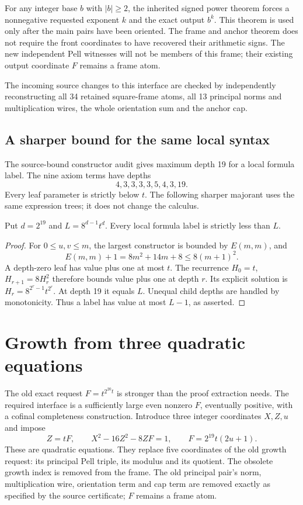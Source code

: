 For any integer base $b$ with $|b|\ge2$, the inherited signed power theorem
forces a nonnegative requested exponent $k$ and the exact output $b^k$.
This theorem is used only after the main pairs have been oriented. The frame
and anchor theorem does not require the front coordinates to have recovered
their arithmetic signs. The new independent Pell witnesses will not be
members of this frame; their existing output coordinate $F$ remains a frame
atom.

The incoming source changes to this interface are checked by independently
reconstructing all 34 retained square-frame atoms, all 13 principal norms and
multiplication wires, the whole orientation sum and the anchor cap.

\subsection{A sharper bound for the same local syntax}

The source-bound constructor audit gives maximum depth 19 for a local formula
label. The nine axiom terms have depths
\[
4,3,3,3,3,5,4,3,19.
\]
Every leaf parameter is strictly below $t$. The following sharper majorant
uses the same expression trees; it does not change the calculus.

\begin{lemma}\label{g210:lem:capacity}
Put $d=2^{19}$ and $L=8^{d-1}t^d$. Every local formula label is strictly
less than $L$.
\end{lemma}
\begin{proof}
For $0\le u,v\le m$, the largest constructor is bounded by $E(m,m)$, and
\[
E(m,m)+1=8m^2+14m+8\le8(m+1)^2.
\]
A depth-zero leaf has value plus one at most $t$. The recurrence
$H_0=t$, $H_{r+1}=8H_r^2$ therefore bounds value plus one at depth $r$.
Its explicit solution is $H_r=8^{2^r-1}t^{2^r}$. At depth 19 it equals
$L$. Unequal child depths are handled by monotonicity. Thus a label has value
at most $L-1$, as asserted.
\end{proof}

\section{Growth from three quadratic equations}\label{g210:sec:growth}

The old exact request $F=t^{2^{20}t}$ is stronger than the proof extraction
needs. The required interface is a sufficiently large even nonzero $F$,
eventually positive, with a cofinal completeness construction. Introduce
three integer coordinates $X,Z,u$ and impose
\begin{equation}\label{g210:eq:growth}
\boxed{\quad Z=tF,\qquad X^2-16Z^2-8ZF=1,\qquad
F=2^{19}t(2u+1).\quad}
\end{equation}
These are quadratic equations. They replace five coordinates of the old
growth request: its principal Pell triple, its modulus and its quotient.
The obsolete growth index is removed from the frame. The old principal pair's
norm, multiplication wire, orientation term and cap term are removed exactly
as specified by the source certificate; $F$ remains a frame atom.

